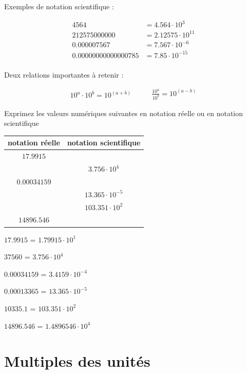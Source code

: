\documentclass[
  11pt,
  french,
  a4paper,
  openany]{book}
\begin{document}
Exemples de notation scientifique :

\[ \begin{split}
    4564 &= 4.564\cdot10^3\\
    212575000000 &= 2.12575\cdot10^{11}\\
    0.000007567 &= 7.567\cdot10^{-6}\\
    0.00000000000000785 &= 7.85\cdot10^{-15}\\
\end{split} \]

Deux relations importantes à retenir :

\[ \begin{split}
    10^a \cdot 10^b = 10^{(a+b)}
\end{split}
\qquad
\begin{split}
    \frac{10^a}{10^b} = 10^{(a-b)}
\end{split} \]

\begin{Exercise}
Exprimez les valeurs numériques suivantes en notation réelle ou en notation scientifique

\end{Exercise}

\begin{longtable}[]{@{}cc@{}}
\toprule
notation réelle & notation scientifique\tabularnewline
\midrule
\endhead
\(17.9915\) &\tabularnewline
& \(3.756 \cdot 10^{4}\)\tabularnewline
\(0.00034159\) &\tabularnewline
& \(13.365 \cdot 10^{-5}\)\tabularnewline
& \(103.351 \cdot 10 ^{2}\)\tabularnewline
\(14896.546\) &\tabularnewline
\bottomrule
\end{longtable}

\begin{Answer}
\(17.9915\) = \(1.79915 \cdot 10^{1}\)

\(37560\) = \(3.756 \cdot 10^{4}\)

\(0.00034159\) = \(3.4159 \cdot 10^{-4}\)

\(0.00013365\) = \(13.365 \cdot 10^{-5}\)

\(10335.1\) = \(103.351 \cdot 10 ^{2}\)

\(14896.546\) = \(1.4896546 \cdot 10^{4}\)

\end{Answer}

\hypertarget{multiples-des-unituxe9s}{%
\section{Multiples des unités}\label{multiples-des-unituxe9s}}
\end{document}
